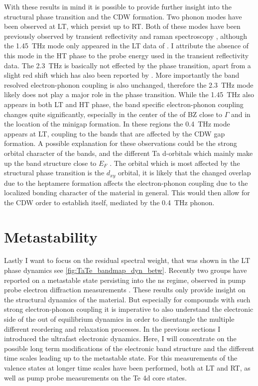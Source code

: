 With these results in mind it is possible to provide further insight into the structural phase transition and the CDW formation.
Two phonon modes have been observed at LT, which persist up to RT.
Both of these modes have been previously observed by transient reflectivity and raman spectroscopy \cite{luo, hu_optical_2022}, although the \qty{1.45}{\tera\hertz} mode only appeared in the LT data of \cite{hu_optical_2022}.
I attribute the absence of this mode in the HT phase to the probe energy used in the transient reflectivity data.
The \qty{2.3}{\tera\hertz} is basically not effected by the phase transition, apart from a slight red shift which has also been reported by \cite{luo, hu_optical_2022}.
More importantly the band resolved electron-phonon coupling is also unchanged, therefore the \qty{2.3}{\tera\hertz} mode likely does not play a major role in the phase transition.
While the \qty{1.45}{\tera\hertz} also appears in both LT and HT phase, the band specific electron-phonon coupling changes quite significantly, especially in the center of the of BZ close to $\Gamma$ and in the location of the minigap formation.
In these regions the \qty{0.4}{\tera\hertz} mode appears at LT, coupling to the bands that are affected by the CDW gap formation.
A possible explanation for these observations could be the strong orbital character of the bands, and the different Ta d-orbitals which mainly make up the band structure close to $E_F$ \cite{mitsuishi_unveiling_2024}.
The orbital which is most affected by the structural phase transition is the $d_{xy}$ orbital, it is likely that the changed overlap due to the heptamere formation affects the electron-phonon coupling due to the localized bonding character of the material in general.
This would then allow for the CDW order to establish itself, mediated by the \qty{0.4}{\tera\hertz} phonon.

\section{Metastability}
\label{sec:meta}

Lastly I want to focus on the residual spectral weight, that was shown in the LT phase dynamics see \ref{fig:TaTe_bandmap_dyn_betw}.
Recently two groups have reported on a metastable state persisting into the \unit{\nano\second} regime, observed in pump probe electron diffraction measurements \cite{siddiqui_ultrafast_2021, domrose_femtosecond_2024}.
These results only provide insight on the structural dynamics of the material.
But especially for compounds with such strong electron-phonon coupling it is imperative to also understand the electronic side of the out of equilibrium dynamics in order to disentangle the multiple different reordering and relaxation processes.
In the previous sections I introduced the ultrafast electronic dynamics.
Here, I will concentrate on the possible long term modifications of the electronic band structure and the different time scales leading up to the metastable state.
For this measurements of the valence states at longer time scales have been performed, both at LT and RT, as well as pump probe measurements on the Te 4d core states.

